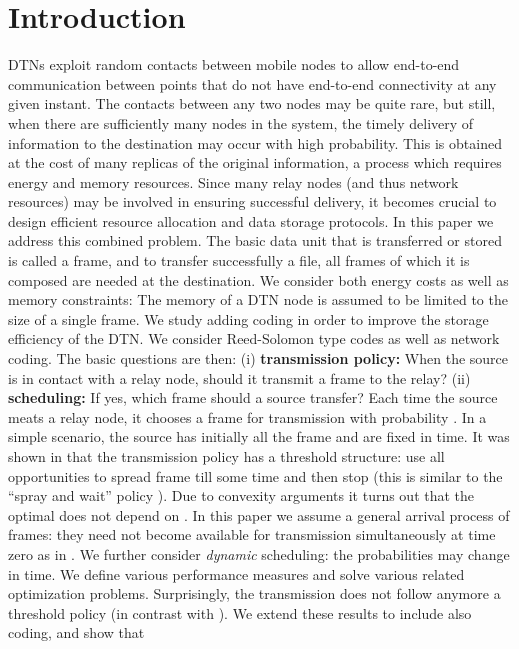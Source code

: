 \documentclass[10pt,twocolumn,conference,final]{IEEEtran}
\begin{document}
\section{Introduction}\label{sec:intro}
DTNs exploit random contacts between mobile nodes
to allow end-to-end communication between points that do not have
end-to-end connectivity at any given instant. The contacts between any
two nodes may be quite rare, but still, when there are sufficiently
many nodes in the system, the timely delivery of information to the destination
may occur with high probability. This is obtained at the cost of
many replicas of the original information, a process which requires
energy and memory resources.
Since many relay nodes (and thus network resources) may be involved in ensuring
successful delivery, it becomes crucial to design efficient resource allocation
and data storage protocols. In this paper we address this combined
problem. The basic data unit that is transferred or stored is called a frame,
and to transfer successfully a file, all frames of which it is composed are
needed at the destination.
We consider both energy costs as well as memory constraints: The memory
of a DTN node is assumed to be limited to the size  of a single frame.
We study adding coding in order to improve
the storage efficiency of the DTN. We consider
Reed-Solomon type codes as well as network coding.
The basic questions are then: (i) {\bf transmission policy:}
When the source is in contact with a relay node, should it transmit a frame to the relay?
(ii) {\bf scheduling:} If yes, which frame should a source transfer?
Each time the source meats a relay node, it chooses a frame  for transmission with probability .
In a simple scenario, the source has initially all the frame and  are fixed  in time.
It was shown in \cite{infocom09} that the transmission policy has a threshold structure: use all opportunities
to spread frame till some time  and then stop  (this is similar to the ``spray and wait'' policy \cite{SPR}).
Due to convexity arguments it turns out that the optimal  does not depend on  \cite{infocom09}.
In this paper we assume a general arrival process of frames: they need
not become available for transmission simultaneously at time zero as in 
\cite{infocom09}. We further consider {\it dynamic} scheduling: the probabilities
 may change in time. We define various performance measures and
solve various related optimization problems.
Surprisingly, the transmission does not follow anymore a
threshold policy (in contrast with \cite{infocom09}). We extend these results to include also coding, and show that
\end{document}
